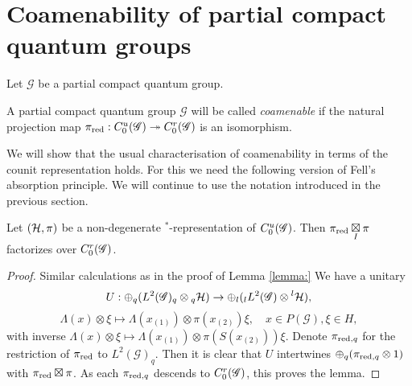 \section{Coamenability of partial compact quantum groups}

Let $\mathscr{G}$ be a partial compact quantum group. 


\begin{Def} A partial compact quantum group $\mathscr{G}$ will be called \emph{coamenable} if the natural projection map $\pi_{\operatorname{\mathrm{red}}}:C^{u}_{0}(\mathscr{G})\twoheadrightarrow C^{r}_{0}(\mathscr{G})$ is an isomorphism.
\end{Def}


We will show that the usual characterisation of coamenability in terms of the counit representation holds. For this we need the following version of Fell's absorption principle. We will continue to use the notation introduced in the previous section.

\begin{Lem}\label{LemFell} Let $(\mathcal{H},\pi)$ be a non-degenerate $^*$-representation of $C^{u}_{0}(\mathscr{G})$. Then $\pi_{\operatorname{\mathrm{red}}}\underset{I}{\boxtimes} \pi$ factorizes over $C^{r}_{0}(\mathscr{G})$.
\end{Lem}

\begin{proof}  Similar calculations as in the proof of Lemma \ref{lemma:} We have a unitary \[U: \oplus_q (L^2(\mathscr{G})_q\otimes {}_q\mathcal{H} ) \rightarrow \oplus_l ({}_l L^2(\mathscr{G})\otimes {}^l\mathcal{H}),\]\[\Lambda(x)\otimes \xi \mapsto \Lambda(x_{(1)})\otimes \pi(x_{(2)})\xi,\quad x\in P(\mathscr{G}),\xi\in H,\] with inverse $\Lambda(x)\otimes \xi \mapsto \Lambda(x_{(1)})\otimes \pi(S(x_{(2)}))\xi$. %
Denote $\pi_{\operatorname{\mathrm{red}},q}$ for the restriction of $\pi_{\operatorname{\mathrm{red}}}$ to $L^2(\mathscr{G})_q$. Then it is clear that $U$ intertwines $\oplus_q (\pi_{\operatorname{\mathrm{red}},q}\otimes 1)$ with $\pi_{\operatorname{\mathrm{red}}}\boxtimes \pi$. As each $\pi_{\operatorname{\mathrm{red}},q}$ descends to $C^{r}_{0}(\mathscr{G})$, this proves the lemma.
\end{proof} 

